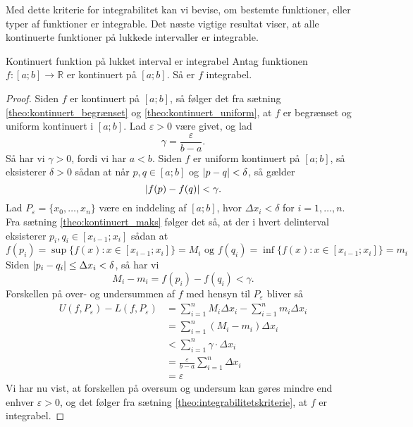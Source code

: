 Med dette kriterie for integrabilitet kan vi bevise, om bestemte funktioner, eller typer af funktioner er integrable.
Det næste vigtige resultat viser, at alle kontinuerte funktioner på lukkede intervaller er integrable.

\begin{theorem}[label=theo:kontinuert_integrabel]{Kontinuert funktion på lukket interval er integrabel}{}
  Antag funktionen $f:[a;b] \to \mathbb{R}$ er kontinuert på $[a;b]$. 
  Så er $f$ integrabel. 
\end{theorem}
\begin{proof} 
  Siden $f$ er kontinuert på $[a;b]$, så følger det fra sætning \ref{theo:kontinuert_begrænset} og \ref{theo:kontinuert_uniform}, at $f$ er begrænset og uniform kontinuert i $[a;b]$. 
  Lad $\varepsilon > 0$ være givet, og lad 
  \[
  \gamma = \frac{\varepsilon }{b-a}.
  \] 
  Så har vi $\gamma >0$, fordi vi har $a<b$. 
  Siden $f$ er uniform kontinuert på $[a;b]$, så eksisterer $\delta >0$ sådan at når $p, q \in [a;b]$ og $\abs{p-q} < \delta  $, så gælder
  \[
  \abs{f(p)-f(q)} < \gamma.
  \] 
  Lad $P _{\varepsilon }=\{ x _{0}, \ldots , x_n \} $ være en inddeling af $[a;b]$, hvor $\Delta x_i < \delta  $ for $i=1, \ldots , n$. 
  Fra sætning \ref{theo:kontinuert_maks} følger det så, at der i hvert delinterval eksisterer $p_i, q_i \in [x_{i-1}; x _{i}]$ sådan at
  \[
  f(p_i)=\sup \{ f(x): x \in [x _{i-1};x _{i}]\} = M_i \text{ og } f(q_i)=\inf \{ f(x): x \in [x _{i-1};x _{i}]\} = m_i
  \] 
  Siden $\abs{p_i - q_i} \leq \Delta x_i < \delta$, så har vi 
\[
  M_i-m_i = f(p_i) - f(q_i) < \gamma. 
\] 
Forskellen på over- og undersummen af $f$ med hensyn til $P _{\varepsilon }$ bliver så
\begin{equation*}
\begin{split}
  U(f, P _{\varepsilon }) - L(f, P _{\varepsilon }) &= \sum_{i=1}^{n} M_i \Delta x_i - \sum_{i=1}^{n} m_i \Delta x_i\\
  &=\sum_{i=1}^{n} \left(M_i - m_i\right) \Delta x_i \\
  &<\sum_{i=1}^{n} \gamma \cdot \Delta x_i \\
  &=\frac{\varepsilon }{b-a} \sum_{i=1}^{n} \Delta x_i \\
  &=\varepsilon 
\end{split}
\end{equation*}
Vi har nu vist, at forskellen på oversum og undersum kan gøres mindre end enhver $\varepsilon >0$, og det følger fra sætning \ref{theo:integrabilitetskriterie}, at $f$ er integrabel. 
\end{proof}

